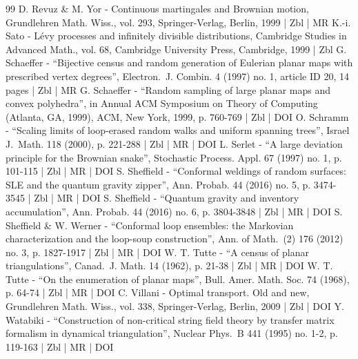 \documentclass[10pt]{amsart}
\theoremstyle{plain}
\numberwithin{theorem}{section}
\theoremstyle{definition}
\begin{document}
\begin{thebibliography}{99}
D. Revuz \& M. Yor - Continuous martingales and Brownian motion, Grundlehren Math. Wiss., vol. 293, Springer-Verlag, Berlin, 1999 | Zbl | MR
K.-i. Sato - Lévy processes and infinitely divisible distributions, Cambridge Studies in Advanced Math., vol. 68, Cambridge University Press, Cambridge, 1999 | Zbl
G. Schaeffer - “Bijective census and random generation of Eulerian planar maps with prescribed vertex degrees”, Electron. J. Combin. 4 (1997) no. 1, article ID 20, 14 pages | Zbl | MR
G. Schaeffer - “Random sampling of large planar maps and convex polyhedra”, in Annual ACM Symposium on Theory of Computing (Atlanta, GA, 1999), ACM, New York, 1999, p. 760-769 | Zbl | DOI
O. Schramm - “Scaling limits of loop-erased random walks and uniform spanning trees”, Israel J. Math. 118 (2000), p. 221-288 | Zbl | MR | DOI
L. Serlet - “A large deviation principle for the Brownian snake”, Stochastic Process. Appl. 67 (1997) no. 1, p. 101-115 | Zbl | MR | DOI
S. Sheffield - “Conformal weldings of random surfaces: SLE and the quantum gravity zipper”, Ann. Probab. 44 (2016) no. 5, p. 3474-3545 | Zbl | MR | DOI
S. Sheffield - “Quantum gravity and inventory accumulation”, Ann. Probab. 44 (2016) no. 6, p. 3804-3848 | Zbl | MR | DOI
S. Sheffield \& W. Werner - “Conformal loop ensembles: the Markovian characterization and the loop-soup construction”, Ann. of Math. (2) 176 (2012) no. 3, p. 1827-1917 | Zbl | MR | DOI
W. T. Tutte - “A census of planar triangulations”, Canad. J. Math. 14 (1962), p. 21-38 | Zbl | MR | DOI
W. T. Tutte - “On the enumeration of planar maps”, Bull. Amer. Math. Soc. 74 (1968), p. 64-74 | Zbl | MR | DOI
C. Villani - Optimal transport. Old and new, Grundlehren Math. Wiss., vol. 338, Springer-Verlag, Berlin, 2009 | Zbl | DOI
Y. Watabiki - “Construction of non-critical string field theory by transfer matrix formalism in dynamical triangulation”, Nuclear Phys. B 441 (1995) no. 1-2, p. 119-163 | Zbl | MR | DOI
\end{thebibliography}
\end{document}
